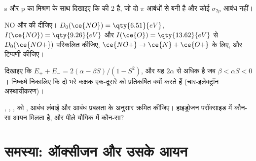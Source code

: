 \begin{exercise}[$\star\star$]\label{exo:b2:diatomic-mos:9}
s और p का मिश्रण के साथ दिखाइए कि  की  2 है, जो दो $\pi$ आबंधों से बनी है और कोई
$\sigma_{2p}$ आबंध नहीं।
\end{exercise}

\begin{exercise}[$\star\star\star$]\label{exo:b2:diatomic-mos:10}
NO और  की  दीजिए। $D_0(\ce{NO}) = \qty{6.51}{eV}$, $I(\ce{NO}) =
\qty{9.26}{eV}$ और $I(\ce{O}) = \qty{13.62}{eV}$ से $D_0(\ce{NO+})$ परिकलित कीजिए,
$\ce{NO+} \to
\ce{N} + \ce{O+}$ के लिए, और टिप्पणी कीजिए।
\end{exercise}

\begin{exercise}[$\star\star\star$]\label{exo:b2:diatomic-mos:11}
दिखाइए कि $E_+ + E_- = 2(\alpha - \beta S)/(1 - S^2)$, और यह $2\alpha$ से अधिक है जब
$\beta < \alpha S < 0$। निष्कर्ष निकालिए कि दो भरे कक्षक एक-दूसरे को प्रतिकर्षित क्यों करते हैं (चार-इलेक्ट्रॉन
अस्थायीकरण)।
\end{exercise}

\begin{exercise}[$\star\star\star$]\label{exo:b2:diatomic-mos:12}
, , ,  को , आबंध लंबाई और आबंध
प्रबलता के अनुसार क्रमित कीजिए। हाइड्रोजन परॉक्साइड में कौन-सा आयन मिलता है, और पीले
यौगिक  में कौन-सा?
\end{exercise}

\section{समस्या: ऑक्सीजन और उसके आयन}

